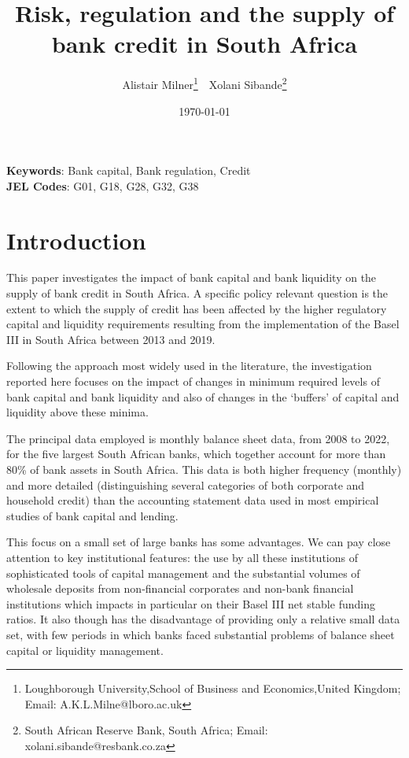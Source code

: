 \documentclass[
  12,
]{article}
\author{}
\date{\vspace{-2.5em}}
\begin{document}
\title{Risk, regulation and the supply of bank credit in South Africa}


\author { 
Alistair Milner\footnote{Loughborough University,School of Business and Economics,United Kingdom; Email: A.K.L.Milne@lboro.ac.uk}  \,\, 
Xolani Sibande\footnote{South African Reserve Bank, South Africa; Email: xolani.sibande@resbank.co.za}
}
\date{\today}
\maketitle

\begin{abstract}


\end{abstract}

\noindent\textbf{Keywords}: Bank capital, Bank regulation, Credit   \\
\textbf{JEL Codes}: G01, G18, G28, G32, G38
\newpage

\hypertarget{introduction}{%
\section{Introduction}\label{introduction}}

This paper investigates the impact of bank capital and bank liquidity on the supply of bank credit in South Africa. A specific policy relevant question is the extent to which the supply of credit has been affected by the higher regulatory capital and liquidity requirements resulting from the implementation of the Basel III in South Africa between 2013 and 2019.

Following the approach most widely used in the literature, the investigation reported here focuses on the impact of changes in minimum required levels of bank capital and bank liquidity and also of changes in the `buffers' of capital and liquidity above these minima.

The principal data employed is monthly balance sheet data, from 2008 to 2022, for the five largest South African banks, which together account for more than 80\% of bank assets in South Africa. This data is both higher frequency (monthly) and more detailed (distinguishing several categories of both corporate and household credit) than the accounting statement data used in most empirical studies of bank capital and lending.

This focus on a small set of large banks has some advantages. We can pay close attention to key institutional features: the use by all these institutions of sophisticated tools of capital management and the substantial volumes of wholesale deposits from non-financial corporates and non-bank financial institutions which impacts in particular on their Basel III net stable funding ratios. It also though has the disadvantage of providing only a relative small data set, with few periods in which banks faced substantial problems of balance sheet capital or liquidity management.
\end{document}
